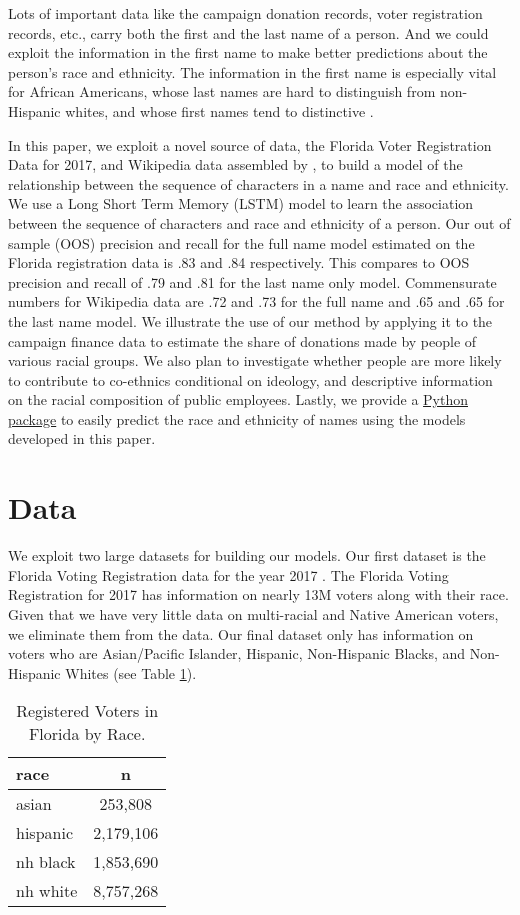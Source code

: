 \documentclass[12pt, letterpaper]{article}
\begin{document}
Lots of important data like the campaign donation records, voter registration records, etc., carry both the first and the last name of a person. And we could exploit the information in the first name to make better predictions about the person's race and ethnicity. The information in the first name is especially vital for African Americans, whose last names are hard to distinguish from non-Hispanic whites, and whose first names tend to distinctive \citep{bertrand2004emily}. 

In this paper, we exploit a novel source of data, the Florida Voter Registration Data for 2017, and Wikipedia data assembled by \citet{ambekar2009name}, to build a model of the relationship between the sequence of characters in a name and race and ethnicity. We use a Long Short Term Memory (LSTM) model \citep{graves2005framewise} to learn the association between the sequence of characters and race and ethnicity of a person. Our out of sample (OOS) precision and recall for the full name model estimated on the Florida registration data is .83 and .84 respectively. This compares to OOS precision and recall of .79 and .81 for the last name only model. Commensurate numbers for Wikipedia data are .72 and .73 for the full name and .65 and .65 for the last name model. We illustrate the use of our method by applying it to the campaign finance data to estimate the share of donations made by people of various racial groups. We also plan to investigate whether people are more likely to contribute to co-ethnics conditional on ideology, and descriptive information on the racial composition of public employees. Lastly, we provide a \href{http://github.com/appeler/ethnicolr}{Python package} to easily predict the race and ethnicity of names using the models developed in this paper.

\section*{Data}
We exploit two large datasets for building our models. Our first dataset is the Florida Voting Registration data for the year 2017 \citep{sood_2017}. The Florida Voting Registration for 2017 has information on nearly 13M voters along with their race. Given that we have very little data on multi-racial and Native American voters, we eliminate them from the data. Our final dataset only has information on voters who are Asian/Pacific Islander, Hispanic, Non-Hispanic Blacks, and Non-Hispanic Whites (see Table \ref{table:fl_data}). 

\begin{table}[h!]
\centering
\caption{Registered Voters in Florida by Race.}
\begin{tabular}{ l c }
\hline    
race & n \\
\hline
asian & 253,808 \\
hispanic & 2,179,106 \\
nh black & 1,853,690 \\
nh white & 8,757,268 \\
\hline
\end{tabular}
\label{table:fl_data}
\end{table}
\end{document}
